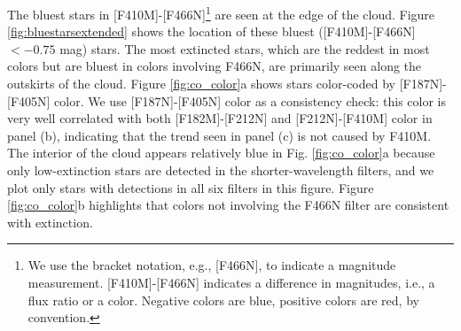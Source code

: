 \documentclass[times,astrosymb,twocolumn]{aastex631}
\def\rr#1{#1}
\begin{document}
The bluest stars in [F410M]-[F466N]\footnote{\rr{We use the bracket notation, e.g., [F466N], to indicate a magnitude measurement.  [F410M]-[F466N] indicates a difference in magnitudes, i.e., a flux ratio or a color.  Negative colors are blue, positive colors are red, by convention.}} are seen at the edge of the cloud.
Figure \ref{fig:bluestarsextended} shows the location of these bluest ([F410M]-[F466N] $< -0.75$ \rr{mag}) stars.
The most extincted stars, which are the reddest in most colors but are bluest in colors involving F466N, are primarily seen along the outskirts of the cloud.
Figure \ref{fig:co_color}a shows stars color-coded by [F187N]-[F405N] color. 
\rr{We use [F187N]-[F405N] color as a consistency check: this color is very well correlated with both [F182M]-[F212N] and [F212N]-[F410M] color in panel (b), indicating that the trend seen in panel (c) is not caused by F410M.}
The interior of the cloud appears relatively blue in Fig. \ref{fig:co_color}a because only low-extinction stars are detected in the shorter-wavelength \rr{filters, and we plot only stars with detections in all six filters in this figure}.
Figure \ref{fig:co_color}b highlights that colors not involving the F466N filter are consistent with extinction.


\end{document}
